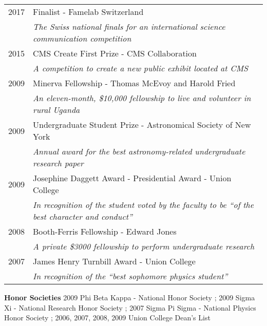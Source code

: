 \documentclass[10pt]{article} %
\begin{document}
\begin{tabular}{rl}	

2017 & Finalist - Famelab Switzerland \\
 {}  & \emph{The Swiss national finals for an international science communication competition} \\

2015 & CMS Create First Prize - CMS Collaboration \\
 {}  & \emph{A competition to create a new public exhibit located at CMS} \\

2009 & Minerva Fellowship - Thomas McEvoy and Harold Fried \\
 {}  & \emph{An eleven-month, \$10,000 fellowship to live and volunteer in rural Uganda} \\

2009 & Undergraduate Student Prize - Astronomical Society of New York \\
 {}  & \emph{Annual award for the best astronomy-related undergraduate research paper} \\

2009 & Josephine Daggett Award - Presidential Award - Union College \\
 {}  & \emph{In recognition of the student voted by the faculty to be ``of the best character and conduct''} \\

2008 & Booth-Ferris Fellowship - Edward Jones \\
 {}  & \emph{A private \$3000 fellowship to perform undergraduate research} \\

2007 & James Henry Turnbill Award - Union College \\
 {}  & \emph{In recognition of the ``best sophomore physics student''} 

\end{tabular}

{\bf Honor Societies} 2009 Phi Beta Kappa - National Honor Society ; 2009 Sigma Xi - National Research Honor Society ; 2007 Sigma Pi Sigma - National Physics Honor Society ; 2006, 2007, 2008, 2009 Union College Dean's List


%
%
\end{document}
